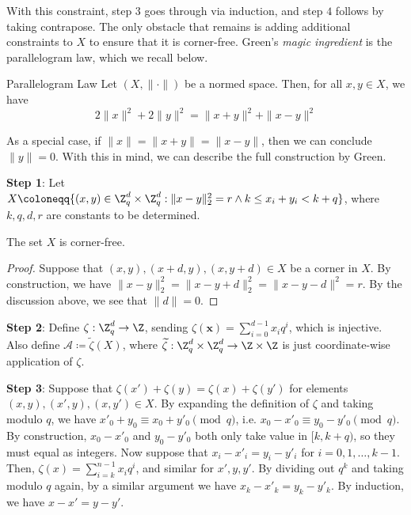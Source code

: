 With this constraint, step \(3\) goes through via induction, and step \(4\) follows by taking contrapose. The only obstacle that remains is adding additional constraints to \(X\) to ensure that it is corner-free. Green's \textit{magic ingredient} is the parallelogram law, which we recall below.

\begin{theorem}{Parallelogram Law}{}
  Let \((X, \| \cdot \|)\) be a normed space. Then, for all \(x, y \in X\), we have
  \[
    2\|x\|^2 + 2\|y\|^2 = \|x + y\|^2 + \|x - y\|^2
  \]
\end{theorem}

As a special case, if \(\|x\| = \|x + y\| = \|x - y\|\), then we can conclude \(\|y\| = 0\). With this in mind, we can describe the full construction by Green.

\textbf{Step 1}: Let \(X \coloneqq \{(x, y) \in \Z_q^d \times \Z_q^d : \|x - y\|_2^2 = r \land k \leq x_i + y_i < k + q\}\), where \(k, q, d, r\) are constants to be determined.

\begin{lemma}
  The set \(X\) is corner-free.
\end{lemma}

\begin{proof}
  Suppose that \((x, y), (x + d, y), (x, y + d) \in X\) be a corner in \(X\). By construction, we have \(\|x - y\|_2^2 = \|x - y + d\|_2^2 = \|x - y - d\|^2 = r\). By the discussion above, we see that \(\|d\| = 0\).
\end{proof}

\vspace{5mm}

\textbf{Step 2}: Define \(\zeta : \Z_q^d \to \Z\), sending \(\zeta(\mathbf{x}) = \sum_{i = 0}^{d - 1} x_i q^i\), which is injective. Also define \(\mathcal{A} \coloneqq \widetilde{\zeta}(X)\), where \(\widetilde{\zeta} : \Z_q^d \times \Z_q^d \to \Z \times \Z\) is just coordinate-wise application of \(\zeta\).

\vspace{5mm}

\textbf{Step 3}: Suppose that \(\zeta(x') + \zeta(y) = \zeta(x) + \zeta(y')\) for elements \((x, y), (x', y), (x, y') \in X\). By expanding the definition of \(\zeta\) and taking modulo \(q\), we have \(x'_0 + y_0 \equiv x_0 + y'_0 \pmod{q}\), i.e. \(x_0 - x'_0 \equiv y_0 - y'_0 \pmod{q}\). By construction, \(x_0 - x'_0\) and \(y_0 - y'_0\) both only take value in \([k, k + q)\), so they must equal as integers. Now suppose that \(x_i - x'_i = y_i - y'_i\) for \(i = 0, 1, \ldots, k - 1\). Then, \(\zeta(x) = \sum_{i = k}^{n - 1} x_i q^i\), and similar for \(x', y, y'\). By dividing out \(q^k\) and taking modulo \(q\) again, by a similar argument we have \(x_k - x'_k = y_k - y'_k\). By induction, we have \(x - x' = y - y'\).

